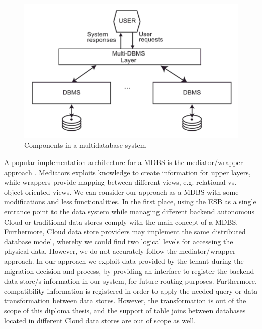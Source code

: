 \begin{figure}[htb]
	\centering
		\includegraphics[clip, scale=0.6]{./gfx/multidatabasesystem.pdf}
	\caption[Multidatabase System Components]{Components in a multidatabase system \cite{ddbsozsu}}
	\label{fig:multidatabasesystem}
\end{figure}

A popular implementation architecture for a \ac{MDBS} is the mediator/wrapper approach \cite{ddbsozsu}. Mediators exploits knowledge to create information for upper layers, while wrappers provide mapping between different views, e.g. relational vs. object-oriented views. We can consider our approach as a \ac{MDBS} with some modifications and less functionalities. In the first place, using the \ac{ESB} as a single entrance point to the data system while managing different backend autonomous Cloud or traditional data stores comply with the main concept of a \ac{MDBS}. Furthermore, Cloud data store providers may implement the same distributed database model, whereby we could find two logical levels for accessing the physical data. However, we do not accurately follow the mediator/wrapper approach. In our approach we exploit data provided by the tenant during the migration decision and process, by providing an interface to register the backend data store/s information in our system, for future routing purposes. Furthermore, compatibility information is registered in order to apply the needed query or data transformation between data stores. However, the transformation is out of the scope of this diploma thesis, and the support of table joins between databases located in different Cloud data stores are out of scope as well.

